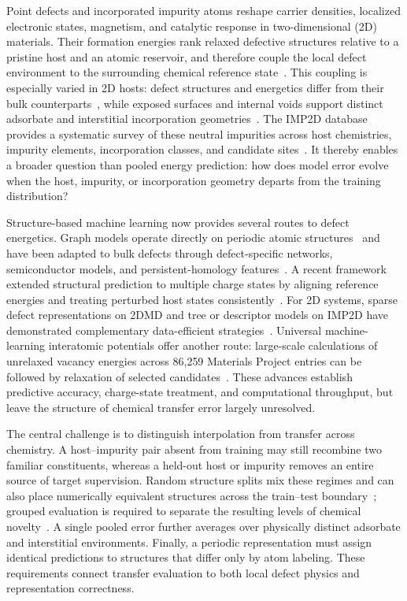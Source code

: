 
Point defects and incorporated impurity atoms reshape carrier densities,
localized electronic states, magnetism, and catalytic response in
two-dimensional (2D) materials.  Their formation energies rank relaxed
defective structures relative to a pristine host and an atomic reservoir, and
therefore couple the local defect environment to the surrounding chemical
reference state~\cite{freysoldt2014}.  This coupling is especially varied in
2D hosts: defect structures and energetics differ from their bulk
counterparts~\cite{komsa2015}, while exposed surfaces and internal voids support distinct
adsorbate and interstitial incorporation geometries~\cite{imp2d2023}.  The
IMP2D database provides a systematic survey of these neutral impurities across
host chemistries, impurity elements, incorporation classes, and candidate
sites~\cite{imp2d2023}.  It thereby enables a broader question than pooled
energy prediction: how does model error evolve when the host, impurity, or
incorporation geometry departs from the training distribution?

Structure-based machine learning now provides several routes to defect
energetics.  Graph models operate directly on periodic atomic
structures~\cite{alignn2021,schutt2018} and have been adapted to bulk defects through
defect-specific networks, semiconductor models, and persistent-homology
features~\cite{witman2023,rahman2024,fang2025}.  A recent framework extended
structural prediction to multiple charge states by aligning reference energies
and treating perturbed host states consistently~\cite{kiyohara2025}.  For 2D
systems, sparse defect representations on 2DMD and tree or descriptor models
on IMP2D have demonstrated complementary data-efficient
strategies~\cite{kazeev2023,kesorn2024,elalouani2026}.  Universal machine-learning
interatomic potentials offer another route: large-scale calculations of
unrelaxed vacancy energies across 86,259 Materials Project entries can be
followed by relaxation of selected candidates~\cite{berger2025screening}.
These advances establish predictive accuracy, charge-state treatment, and
computational throughput, but leave the structure of chemical transfer error
largely unresolved.

The central challenge is to distinguish interpolation from transfer across
chemistry.  A host--impurity pair absent from training may still recombine two
familiar constituents, whereas a held-out host or impurity removes an entire
source of target supervision.  Random structure splits mix these regimes and
can also place numerically equivalent structures across the train--test
boundary~\cite{li2024mdhit}; grouped evaluation is required to separate the
resulting levels of chemical novelty~\cite{omee2024,li2025ood}.  A single
pooled error further averages over physically distinct adsorbate and
interstitial environments.  Finally, a periodic representation must assign
identical predictions to structures that differ only by atom labeling.  These
requirements connect transfer evaluation to both local defect physics and
representation correctness.

